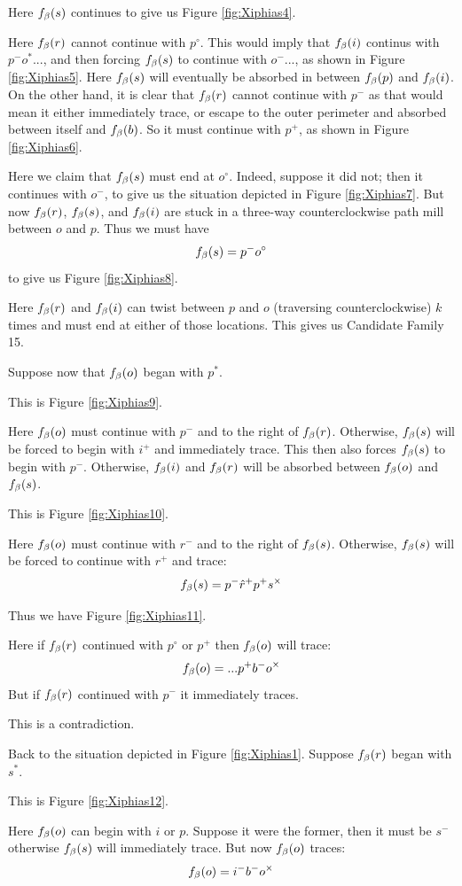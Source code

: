 Here $f_\beta(s)$ continues to give us Figure \ref{fig:Xiphias4}.

Here $f_\beta(r)$ cannot continue with $p^\circ$. This would imply that $f_\beta(i)$ continus with $p^- o^*...$, and then forcing $f_\beta(s)$ to continue with $o^-...$, as shown in Figure \ref{fig:Xiphias5}. Here $f_\beta(s)$ will eventually be absorbed in between $f_\beta(p)$ and $f_\beta(i)$. On the other hand, it is clear that $f_\beta(r)$ cannot continue with $p^-$ as that would mean it either immediately trace, or escape to the outer perimeter and absorbed between itself and $f_\beta(b)$. So it must continue with $p^+$, as shown in Figure \ref{fig:Xiphias6}.

Here we claim that $f_\beta(s)$ must end at $o^\circ$. Indeed, suppose it did not; then it continues with $o^-$, to give us the situation depicted in Figure \ref{fig:Xiphias7}. But now $f_\beta(r)$, $f_\beta(s)$, and $f_\beta(i)$ are stuck in a three-way counterclockwise path mill between $o$ and $p$. Thus we must have
$$f_\beta(s) = p^- o^\circ$$
to give us Figure \ref{fig:Xiphias8}.

Here $f_\beta(r)$ and $f_\beta(i)$ can twist between $p$ and $o$ (traversing counterclockwise) $k$ times and must end at either of those locations. This gives us Candidate Family 15.

Suppose now that $f_\beta(o)$ began with $p^*$. 

This is Figure \ref{fig:Xiphias9}.

Here $f_\beta(o)$ must continue with $p^-$ and to the right of $f_\beta(r)$. Otherwise, $f_\beta(s)$ will be forced to begin with $i^+$ and immediately trace. This then also forces $f_\beta(s)$ to begin with $p^-$. Otherwise, $f_\beta(i)$ and $f_\beta(r)$ will be absorbed between $f_\beta(o)$ and $f_\beta(s)$.

This is Figure \ref{fig:Xiphias10}.

Here $f_\beta(o)$ must continue with $r^-$ and to the right of $f_\beta(s)$. Otherwise, $f_\beta(s)$ will be forced to continue with $r^+$ and trace:
$$f_\beta(s) = p^- \hat{r}^+ p^+ s^\times$$

Thus we have Figure \ref{fig:Xiphias11}.

Here if $f_\beta(r)$ continued with $p^\circ$ or $p^+$ then $f_\beta(o)$ will trace:
$$f_\beta(o) = ...p^+ b^- o^\times$$
But if $f_\beta(r)$ continued with $p^-$ it immediately traces.

This is a contradiction.

Back to the situation depicted in Figure \ref{fig:Xiphias1}. Suppose $f_\beta(r)$ began with  $s^*$.

This is Figure \ref{fig:Xiphias12}.

Here $f_\beta(o)$ can begin with $i$ or $p$. Suppose it were the former, then it must be $s^-$ otherwise $f_\beta(s)$ will immediately trace. But now $f_\beta(o)$ traces:
$$f_\beta(o) = i^- b^- o^\times$$

